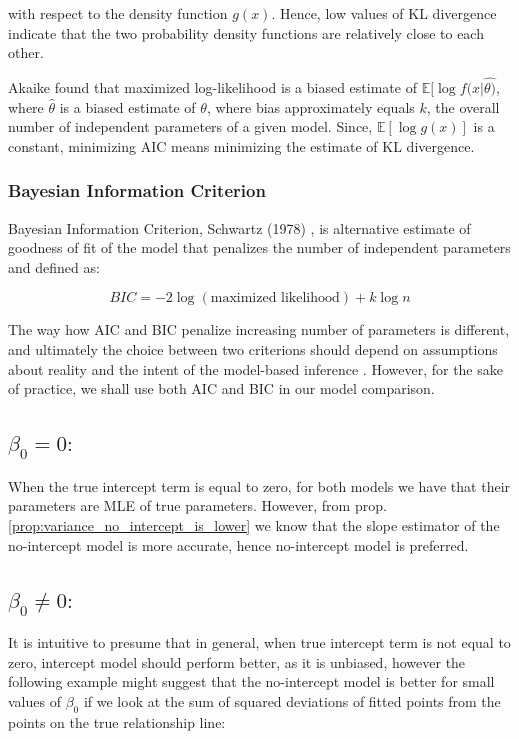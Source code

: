 \documentclass[12pt,a4paper,oneside]{book} %
\newcommand{\E}{\mathbb{E}}
\begin{document}
with respect to the density function $g(x)$. Hence, low values of KL divergence indicate that the two probability density functions are relatively close to each other.

Akaike found that maximized log-likelihood is a biased estimate of 
$\E [\log f(x|\hat{\theta)}$,
 where $\hat{\theta}$ is a biased estimate of $\theta$, where bias approximately equals $k$, the overall number of independent parameters of a given model. Since, $\E [\log g(x)]$ is a constant, minimizing AIC means minimizing the estimate of KL divergence. 



\subsubsection{Bayesian Information Criterion}

Bayesian Information Criterion, Schwartz (1978) \cite{schwarz1978estimating},  is alternative estimate of goodness of fit of the model that penalizes the number of independent parameters and defined as:

\begin{equation}
	BIC = -2 \log(\text{maximized likelihood})+ k \log n
\end{equation}

The way how AIC and BIC penalize increasing number of parameters is different, and ultimately the choice between two criterions should depend on assumptions about reality and the intent of the model-based inference \cite{burnham2004multimodel}. However, for the sake of practice, we shall use both AIC and BIC in our model comparison.



\subsection{$\beta_0 = 0:$}

When the true intercept term is equal to zero, for both models we have that their parameters are MLE of true parameters. However, from prop. \ref{prop:variance_no_intercept_is_lower} we know that the slope estimator of the no-intercept model is more accurate, hence no-intercept model is preferred.


\subsection{$\beta_0 \neq 0:$}

It is intuitive to presume that in general, when true intercept term is not equal to zero, intercept model should perform better, as it is unbiased, however the following example might suggest that the no-intercept model is better for small values of $\beta_0$ if we look at the sum of squared deviations of fitted points from the points on the true relationship line:
\end{document}
